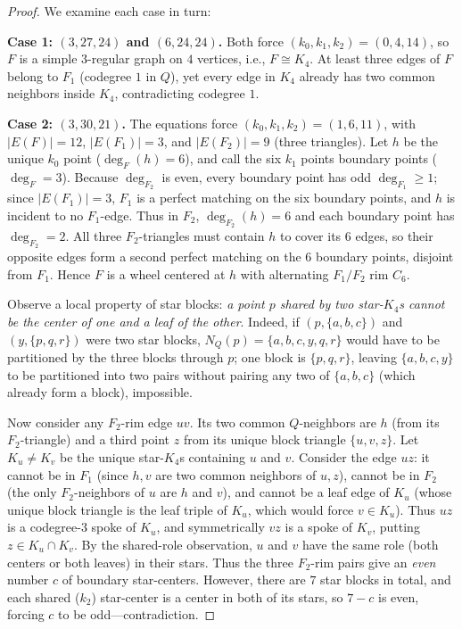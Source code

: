 \documentclass[11pt]{amsart}
\theoremstyle{definition}
\theoremstyle{remark}
\begin{document}
\begin{proof}
We examine each case in turn:

\smallskip\noindent\textbf{Case 1: $(3,27,24)$ and $(6,24,24)$.} Both force $(k_0, k_1, k_2) = (0, 4, 14)$, so $F$ is a simple $3$-regular graph on $4$ vertices, i.e., $F \cong K_4$. At least three edges of $F$ belong to $F_1$ (codegree $1$ in $Q$), yet every edge in $K_4$ already has two common neighbors inside $K_4$, contradicting codegree $1$.

\smallskip\noindent\textbf{Case 2: $(3,30,21)$.} The equations force $(k_0, k_1, k_2) = (1, 6, 11)$, with $|E(F)| = 12$, $|E(F_1)| = 3$, and $|E(F_2)| = 9$ (three triangles). Let $h$ be the unique $k_0$ point ($\deg_F(h) = 6$), and call the six $k_1$ points boundary points ($\deg_F = 3$). Because $\deg_{F_2}$ is even, every boundary point has odd $\deg_{F_1} \ge 1$; since $|E(F_1)| = 3$, $F_1$ is a perfect matching on the six boundary points, and $h$ is incident to no $F_1$-edge. Thus in $F_2$, $\deg_{F_2}(h) = 6$ and each boundary point has $\deg_{F_2} = 2$. All three $F_2$-triangles must contain $h$ to cover its $6$ edges, so their opposite edges form a second perfect matching on the $6$ boundary points, disjoint from $F_1$. Hence $F$ is a wheel centered at $h$ with alternating $F_1/F_2$ rim $C_6$.

Observe a local property of star blocks: \emph{a point $p$ shared by two star-$K_4$s cannot be the center of one and a leaf of the other}. Indeed, if $(p, \{a,b,c\})$ and $(y, \{p,q,r\})$ were two star blocks, $N_Q(p) = \{a,b,c,y,q,r\}$ would have to be partitioned by the three blocks through $p$; one block is $\{p,q,r\}$, leaving $\{a,b,c,y\}$ to be partitioned into two pairs without pairing any two of $\{a,b,c\}$ (which already form a block), impossible.

Now consider any $F_2$-rim edge $uv$. Its two common $Q$-neighbors are $h$ (from its $F_2$-triangle) and a third point $z$ from its unique block triangle $\{u,v,z\}$. Let $K_u \ne K_v$ be the unique star-$K_4$s containing $u$ and $v$. Consider the edge $uz$: it cannot be in $F_1$ (since $h, v$ are two common neighbors of $u, z$), cannot be in $F_2$ (the only $F_2$-neighbors of $u$ are $h$ and $v$), and cannot be a leaf edge of $K_u$ (whose unique block triangle is the leaf triple of $K_u$, which would force $v \in K_u$). Thus $uz$ is a codegree-$3$ spoke of $K_u$, and symmetrically $vz$ is a spoke of $K_v$, putting $z \in K_u \cap K_v$. By the shared-role observation, $u$ and $v$ have the same role (both centers or both leaves) in their stars. Thus the three $F_2$-rim pairs give an \emph{even} number $c$ of boundary star-centers. However, there are $7$ star blocks in total, and each shared ($k_2$) star-center is a center in both of its stars, so $7 - c$ is even, forcing $c$ to be odd---contradiction.


\end{proof}
\end{document}
